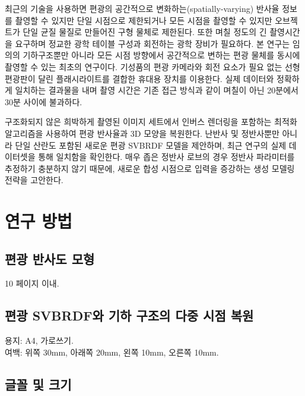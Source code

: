 \documentclass[a4paper,twocolumn]{article}
\begin{document}
최근의 기술을 사용하면 편광의 공간적으로 변화하는(spatially-varying) 반사율 정보를 촬영할 수 있지만 단일 시점으로 제한되거나 모든 시점을 촬영할 수 있지만 오브젝트가 단일 균질 물질로 만들어진 구형 물체로 제한된다.
또한 며칠 정도의 긴 촬영시간을 요구하며 정교한 광학 테이블 구성과 회전하는 광학 장비가 필요하다.
본 연구는 임의의 기하구조뿐만 아니라 모든 시점 방향에서 공간적으로 변하는 편광 물체를 동시에 촬영할 수 있는 최초의 연구이다. 기성품의 편광 카메라와 회전 요소가 필요 없는 선형 편광판이 달린 플래시라이트를 결합한 휴대용 장치를 이용한다. 
실제 데이터와 정확하게 일치하는 결과물을 내며 촬영 시간은 기존 접근 방식과 같이 며칠이 아닌 20분에서 30분 사이에 불과하다.

구조화되지 않은 희박하게 촬영된 이미지 세트에서 인버스 렌더링을 포함하는 최적화 알고리즘을 사용하여 편광 반사율과 3D 모양을 복원한다. 
난반사 및 정반사뿐만 아니라 단일 산란도 포함된 새로운 편광 SVBRDF 모델을 제안하며, 최근 연구의 실제 데이터셋을 통해 일치함을 확인한다.
매우 좁은 정반사 로브의 경우 정반사 파라미터를 추정하기 충분하지 않기 때문에, 새로운 합성 시점으로 입력을 증강하는 생성 모델링 전략을 고안한다.

\section{연구 방법}
\label{sec:methods}


\subsection{편광 반사도 모형}
\label{subsec:model}

10 페이지 이내.


\subsection{편광 SVBRDF와 기하 구조의 다중 시점 복원}
\label{subsec:reconstruction}

용지: A4, 가로쓰기. \\
여백: 위쪽 30mm, 아래쪽 20mm, 왼쪽 10mm, 오른쪽 10mm.


\subsection{글꼴 및 크기}
\label{subsec:paper_font}
\end{document}
